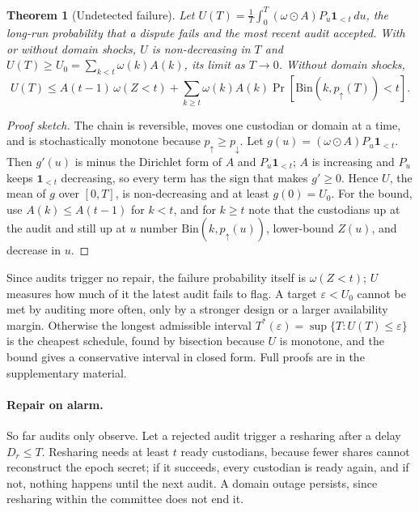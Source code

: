 \documentclass[Crown,sagev]{sagej}
\theoremstyle{plain}
\newtheorem{theorem}{Theorem}
\theoremstyle{definition}
\theoremstyle{remark}
\begin{document}
\begin{theorem}[Undetected failure]\label{thm:floor}
Let $U(T)=\frac1T\int_0^T(\omega\odot A)P_u\mathbf{1}_{<t}\,du$, the long-run probability that a dispute fails and the most recent audit accepted. With or without domain shocks, $U$ is non-decreasing in $T$ and $U(T)\ge U_0=\sum_{k<t}\omega(k)A(k)$, its limit as $T\to0$. Without domain shocks,
\[
U(T)\le A(t-1)\,\omega(Z<t)+\sum_{k\ge t}\omega(k)A(k)\Pr[\mathrm{Bin}(k,p_{\uparrow}(T))<t].
\]
\end{theorem}

\begin{proof}[Proof sketch]
The chain is reversible, moves one custodian or domain at a time, and is stochastically monotone because $p_{\uparrow}\ge p_{\downarrow}$. Let $g(u)=(\omega\odot A)P_u\mathbf{1}_{<t}$. Then $g'(u)$ is minus the Dirichlet form of $A$ and $P_u\mathbf{1}_{<t}$; $A$ is increasing and $P_u$ keeps $\mathbf{1}_{<t}$ decreasing, so every term has the sign that makes $g'\ge0$. Hence $U$, the mean of $g$ over $[0,T]$, is non-decreasing and at least $g(0)=U_0$. For the bound, use $A(k)\le A(t-1)$ for $k<t$, and for $k\ge t$ note that the custodians up at the audit and still up at $u$ number $\mathrm{Bin}(k,p_{\uparrow}(u))$, lower-bound $Z(u)$, and decrease in $u$.
\end{proof}

Since audits trigger no repair, the failure probability itself is $\omega(Z<t)$; $U$ measures how much of it the latest audit fails to flag. A target $\varepsilon<U_0$ cannot be met by auditing more often, only by a stronger design or a larger availability margin. Otherwise the longest admissible interval $T^{*}(\varepsilon)=\sup\{T:U(T)\le\varepsilon\}$ is the cheapest schedule, found by bisection because $U$ is monotone, and the bound gives a conservative interval in closed form. Full proofs are in the supplementary material.

\paragraph{Repair on alarm.} So far audits only observe. Let a rejected audit trigger a resharing after a delay $D_r\le T$. Resharing needs at least $t$ ready custodians, because fewer shares cannot reconstruct the epoch secret; if it succeeds, every custodian is ready again, and if not, nothing happens until the next audit. A domain outage persists, since resharing within the committee does not end it.
\end{document}
